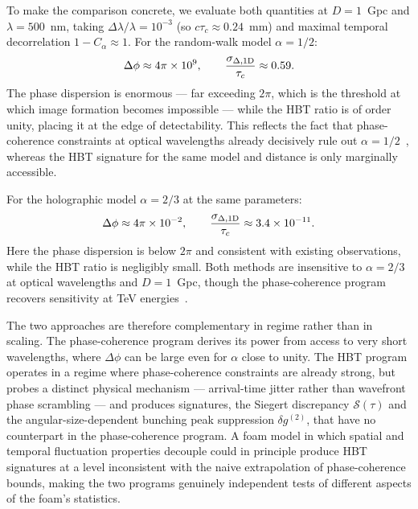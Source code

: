 \documentclass[aps,prd,onecolumn,amsmath,amssymb]{revtex4-2}
\begin{document}
To make the comparison concrete, we evaluate both quantities at
$D = 1$~Gpc and $\lambda = 500$~nm, taking $\Delta\lambda/\lambda = 10^{-3}$
(so $c\tau_c \approx 0.24$~mm) and maximal temporal decorrelation
$1 - C_\alpha \approx 1$.
For the random-walk model $\alpha = 1/2$:
\begin{equation}
  \Delta\phi \approx 4\pi \times 10^{9}, \qquad
  \frac{\sigma_{\Delta,{\rm 1D}}}{\tau_c} \approx 0.59.
  \label{eq:comparison_alpha12}
\end{equation}
The phase dispersion is enormous — far exceeding $2\pi$, which is the
threshold at which image formation becomes impossible — while the HBT
ratio is of order unity, placing it at the edge of detectability.
This reflects the fact that phase-coherence constraints at optical wavelengths
already decisively rule out $\alpha = 1/2$~\cite{Perlman2015}, whereas the
HBT signature for the same model and distance is only marginally accessible.

For the holographic model $\alpha = 2/3$ at the same parameters:
\begin{equation}
  \Delta\phi \approx 4\pi \times 10^{-2}, \qquad
  \frac{\sigma_{\Delta,{\rm 1D}}}{\tau_c} \approx 3.4\times10^{-11}.
  \label{eq:comparison_alpha23}
\end{equation}
Here the phase dispersion is below $2\pi$ and consistent with existing
observations, while the HBT ratio is negligibly small.
Both methods are insensitive to $\alpha = 2/3$ at optical wavelengths and
$D = 1$~Gpc, though the phase-coherence program recovers sensitivity at
TeV energies~\cite{Perlman2015}.

The two approaches are therefore complementary in regime rather than in
scaling. The phase-coherence program derives its power from access to
very short wavelengths, where $\Delta\phi$ can be large even for
$\alpha$ close to unity. The HBT program operates in a regime where
phase-coherence constraints are already strong, but probes a distinct
physical mechanism — arrival-time jitter rather than wavefront phase
scrambling — and produces signatures, the Siegert discrepancy
$\mathcal{S}(\tau)$ and the angular-size-dependent bunching peak
suppression $\delta g^{(2)}$, that have no counterpart in the
phase-coherence program.
A foam model in which spatial and temporal fluctuation properties
decouple could in principle produce HBT signatures at a level
inconsistent with the naive extrapolation of phase-coherence bounds,
making the two programs genuinely independent tests of different
aspects of the foam's statistics.
\end{document}
